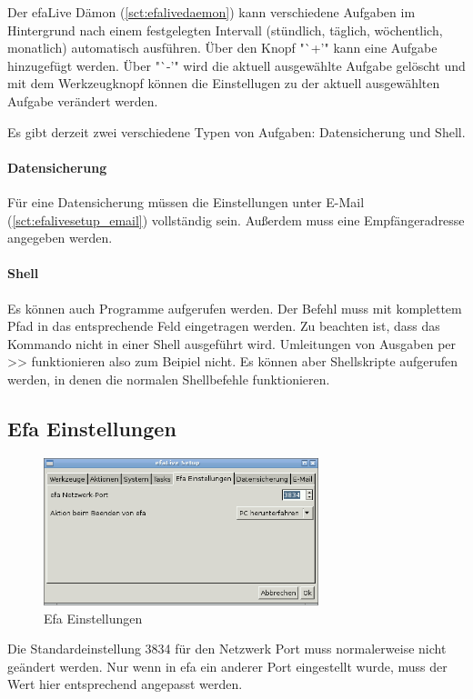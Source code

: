 \documentclass[a4paper,12pt,twoside]{article}
\begin{document}
Der efaLive Dämon (\ref{sct:efalivedaemon}) kann verschiedene Aufgaben im
Hintergrund nach einem festgelegten Intervall (stündlich, täglich, 
wöchentlich, monatlich) automatisch ausführen. Über den
Knopf "`+'" kann eine Aufgabe hinzugefügt werden. Über "`-'" wird die aktuell 
ausgewählte Aufgabe gelöscht und mit dem Werkzeugknopf können die Einstellugen
zu der aktuell ausgewählten Aufgabe verändert werden.

Es gibt derzeit zwei verschiedene Typen von Aufgaben: Datensicherung und Shell.

\paragraph{Datensicherung}
Für eine Datensicherung müssen die Einstellungen unter E-Mail (\ref{sct:efalivesetup_email})
vollständig sein. Außerdem muss eine Empfängeradresse angegeben werden.

\paragraph{Shell}
Es können auch Programme aufgerufen werden. Der Befehl muss mit komplettem Pfad in 
das entsprechende Feld eingetragen werden. Zu beachten ist, dass das Kommando nicht 
in einer Shell ausgeführt wird. Umleitungen von Ausgaben per >> funktionieren also
zum Beipiel nicht. Es können aber Shellskripte aufgerufen werden, in denen 
die normalen Shellbefehle funktionieren.


\subsection{Efa Einstellungen}
\label{sct:efalivesetup_efa_settings}

\begin{figure}
    \centering
    \includegraphics[width=8cm]{screenshots/efalive_setup_efa-settings.png}
    \caption{Efa Einstellungen}
    \label{fig:efalivesetup_efasettings}
\end{figure}

Die Standardeinstellung 3834 für den Netzwerk Port muss normalerweise nicht 
geändert werden. Nur wenn in efa ein
anderer Port eingestellt wurde, muss der Wert hier entsprechend
angepasst werden.
\end{document}
